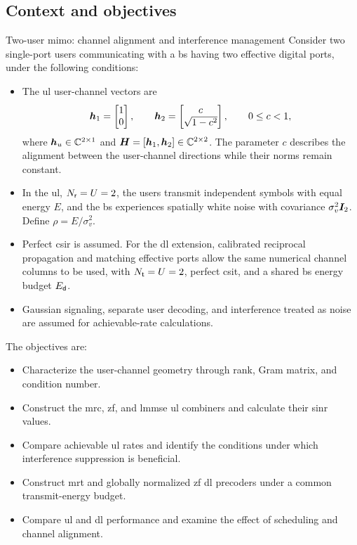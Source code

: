 \subsection{Context and objectives}
\begin{example}{Two-user \ac{mimo}: channel alignment and interference management}
	Consider two single-port users communicating with a \ac{bs} having two effective digital ports, under the following conditions:
	\begin{itemize}
		\item The \ac{ul} user-channel vectors are
		\begin{equation}
			\bm{h}_1=\begin{bmatrix}1\\0\end{bmatrix},
			\qquad
			\bm{h}_2=\begin{bmatrix}c\\\sqrt{1-c^2}\end{bmatrix},
			\qquad 0\leq c<1,
			\label{eq06:mu-channel}
		\end{equation}
		where $\bm{h}_u\in\mathbb{C}^{2\times1}$ and $\bm{H}=[\bm{h}_1,\bm{h}_2]\in\mathbb{C}^{2\times2}$. The parameter $c$ describes the alignment between the user-channel directions while their norms remain constant.
		\item In the \ac{ul}, $N_{\mathsf{r}}=U=2$, the users transmit independent symbols with equal energy $E$, and the \ac{bs} experiences spatially white noise with covariance $\sigma_v^2\bm{I}_2$. Define $\rho=E/\sigma_v^2$.
		\item Perfect \ac{csir} is assumed. For the \ac{dl} extension, calibrated reciprocal propagation and matching effective ports allow the same numerical channel columns to be used, with $N_{\mathsf{t}}=U=2$, perfect \ac{csit}, and a shared \ac{bs} energy budget $E_{\mathsf{d}}$.
		\item Gaussian signaling, separate user decoding, and interference treated as noise are assumed for achievable-rate calculations.
	\end{itemize}
	
	The objectives are:
	\begin{itemize}
		\item Characterize the user-channel geometry through rank, Gram matrix, and condition number.
		\item Construct the \ac{mrc}, \ac{zf}, and \ac{lmmse} \ac{ul} combiners and calculate their \ac{sinr} values.
		\item Compare achievable \ac{ul} rates and identify the conditions under which interference suppression is beneficial.
		\item Construct \ac{mrt} and globally normalized \ac{zf} \ac{dl} precoders under a common transmit-energy budget.
		\item Compare \ac{ul} and \ac{dl} performance and examine the effect of scheduling and channel alignment.
	\end{itemize}
\end{example}


